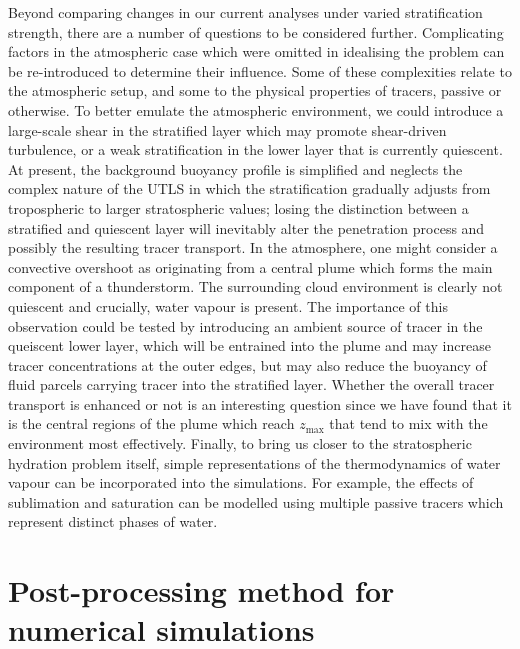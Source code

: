 \documentclass[a4paper]{article}
\begin{document}
Beyond comparing changes in our current analyses under varied stratification strength, there are a number of
questions to be considered further. Complicating factors in the atmospheric case which were omitted in
idealising the problem can be re-introduced to determine their influence. Some of these complexities relate to
the atmospheric setup, and some to the physical properties of tracers, passive or otherwise. To better emulate
the atmospheric environment, we could introduce a large-scale shear in the stratified layer which may promote
shear-driven turbulence, or a weak stratification in the lower layer that is currently quiescent. At
present, the background buoyancy profile is simplified and neglects the complex nature of the UTLS in which
the stratification gradually adjusts from tropospheric to larger stratospheric values; losing the distinction
between a stratified and quiescent layer will inevitably alter the penetration process and possibly the
resulting tracer transport. In the atmosphere, one might consider a convective overshoot as originating from a
central plume which forms the main component of a thunderstorm. The surrounding cloud environment is clearly
not quiescent and crucially, water vapour is present. The importance of this observation could be tested by
introducing an ambient source of tracer in the queiscent lower layer, which will be entrained into the plume
and may increase tracer concentrations at the outer edges, but may also reduce the buoyancy of fluid parcels
carrying tracer into the stratified layer. Whether the overall tracer transport is enhanced or not is an
interesting question since we have found that it is the central regions of the plume which reach $z_{\max}$
that tend to mix with the environment most effectively. Finally, to bring us closer to the stratospheric
hydration problem itself, simple representations of the thermodynamics of water vapour can be incorporated
into the simulations. For example, the effects of sublimation and saturation can be modelled using multiple
passive tracers which represent distinct phases of water.


\appendix

\section{Post-processing method for numerical simulations}
\label{app:postprocessing}
\end{document}
